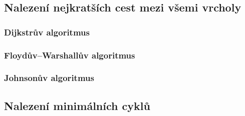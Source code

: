 \subsection{Nalezení nejkratších cest mezi všemi vrcholy}

\subsubsection{Dijkstrův algoritmus}
\subsubsection{Floydův–Warshallův algoritmus}
\subsubsection{Johnsonův algoritmus}


\subsection{Nalezení minimálních cyklů}
